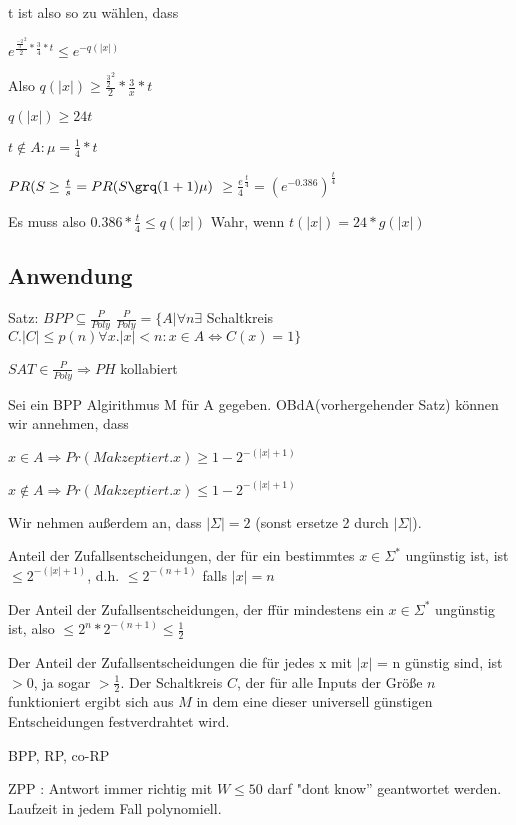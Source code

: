 t ist also so zu wählen, dass

$e ^ {\frac{\frac{-2}{3}^2}{2} * \frac{3}{4} * t} \leq e^{-q(|x|)}$

Also $q(|x|) \geq \frac{\frac{3}{2}^2}{2} * \frac{3}{x} * t$

$q(|x|) \geq 24 t$

$t \notin A : \mu = \frac{1}{4} * t $

$ PR( S\geq \frac{t}{s} = PR (S \grq (1+1) \mu ) $
$ \geq \frac{e}{4}^\frac{t}{4} = (e^{-0.386})^\frac{t}{4}$

Es muss also
$0.386 * \frac{t}{4} \leq q(|x|)$
Wahr, wenn $t(|x|)=24 * g(|x|)$

\subsection{Anwendung}
Satz: $BPP \subseteq \frac{P}{Poly}$
$\frac{P}{Poly} = \{A | \forall n \exists$  Schaltkreis $C. |C| \leq p(n) \forall x . |x| < n : x \in A \Leftrightarrow C(x) = 1\} $

$SAT \in \frac{P}{Poly} \Rightarrow PH$ kollabiert

\begin{beweis}
Sei ein BPP Algirithmus M für A gegeben. OBdA(vorhergehender Satz) können wir annehmen, dass

$ x \in A  \Rightarrow Pr (M akzeptiert . x) \geq 1-2^{-(|x| + 1)}$

$ x \notin  A  \Rightarrow Pr (M akzeptiert . x) \leq 1-2^{-(|x| + 1)}$

Wir nehmen außerdem an, dass $| \Sigma  | = 2$ (sonst ersetze 2 durch $| \Sigma|$).

Anteil der Zufallsentscheidungen, der für ein bestimmtes $x\in \Sigma^*$
ungünstig ist, ist $\leq 2 ^{-(|x| + 1)}$, d.h. $\leq 2^{-(n+1)}$ falls
$|x| = n$

Der Anteil der Zufallsentscheidungen, der ffür mindestens ein $x\in \Sigma^*$
ungünstig ist, also $\leq 2^n * 2^{-(n+1)} \leq \frac{1}{2}$

Der Anteil der Zufallsentscheidungen die für jedes x mit $|x|$ = n günstig  sind,
ist $>0$, ja sogar $> \frac{1}{2}$. Der Schaltkreis $C$, der für alle Inputs der
Größe $n$ funktioniert ergibt sich aus $M$ in dem eine dieser universell
günstigen Entscheidungen festverdrahtet wird.
\end{beweis}

BPP, RP, co-RP \checked

ZPP : Antwort immer richtig mit $W\leq 50$ darf "dont know'' geantwortet werden. Laufzeit in jedem Fall polynomiell.


